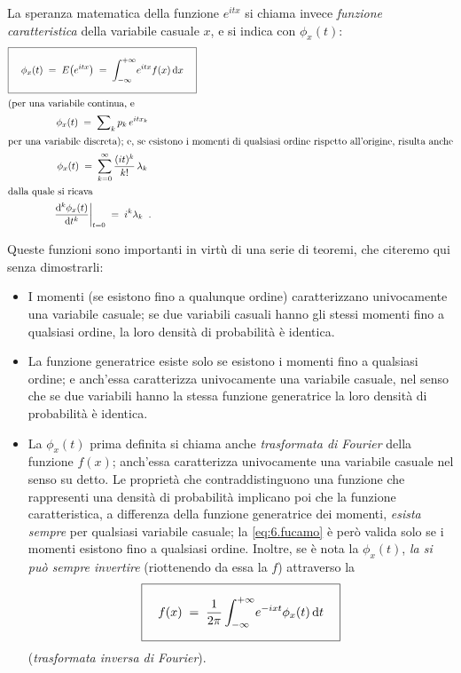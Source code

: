 %
La speranza matematica della funzione $e^{itx}$ si chiama
invece \emph{funzione caratteristica} della variabile
casuale $x$, e si indica con $\phi_x(t)$:
\begin{gather}
  \boxed{ \rule[-6mm]{0mm}{14mm} \quad
    \phi_x(t) \; = \; E \bigl( e^{itx} \bigr) \; = \;
      \int_{-\infty}^{+\infty} \! e^{itx} f(x) \, \de x
    \quad } \label{eq:6.funcar} \\
  \intertext{(per una variabile continua, e}
  \phi_x(t) \; = \; \sum\nolimits_k p_k \, e^{i t x_k}
    \label{eq:6.fucadi} \\
  \intertext{per una variabile discreta); e, se esistono i
    momenti di qualsiasi ordine rispetto all'origine,
    risulta anche}
  \phi_x(t) \; = \; \sum_{k=0}^\infty \frac{(it)^k}{k!}
    \, \lambda_k \label{eq:6.funcar1} \\
  \intertext{dalla quale si ricava}
  \left. \frac{\de^k \phi_x(t)}{\de t^k} \right|_{t=0}
    \; = \; i^k \lambda_k \peq . \label{eq:6.fucamo}
\end{gather}%

Queste funzioni sono importanti in virt\`u di una serie di
teoremi, che citeremo qui senza dimostrarli:
\begin{itemize}
\item I momenti (se esistono fino a qualunque ordine)
  caratterizzano univocamente una variabile casuale; se due
  variabili casuali hanno gli stessi momenti fino a
  qualsiasi ordine, la loro densit\`a di probabilit\`a \`e
  identica.
\item La funzione generatrice esiste solo se esistono i
  momenti fino a qualsiasi ordine; e anch'essa caratterizza
  univocamente una variabile casuale, nel senso che se due
  variabili hanno la stessa funzione generatrice la loro
  densit\`a di probabilit\`a \`e identica.
\item La $\phi_x(t)$ prima definita si chiama anche
  \emph{trasformata di Fourier}%
  della funzione $f(x)$; anch'essa caratterizza univocamente
  una variabile casuale nel senso su detto.  Le propriet\`a
  che contraddistinguono una funzione che rappresenti una
  densit\`a di probabilit\`a implicano poi che la funzione
  caratteristica, a differenza della funzione generatrice
  dei momenti, \emph{esista sempre} per qualsiasi variabile
  casuale; la \eqref{eq:6.fucamo} \`e per\`o valida solo se
  i momenti esistono fino a qualsiasi ordine.  Inoltre, se
  \`e nota la $\phi_x(t)$, \emph{la si pu\`o sempre
    invertire} (riottenendo da essa la $f$) attraverso la
  \begin{equation} \label{eq:6.trinfo}
    \boxed{ \rule[-6mm]{0mm}{14mm} \quad
      f(x) \; = \; \frac{1}{2\pi}
        \int_{-\infty}^{+\infty} \! e^{-ixt} \phi_x(t)
        \, \de t \quad }
  \end{equation}
  (\emph{trasformata inversa di Fourier}).%
\end{itemize}

